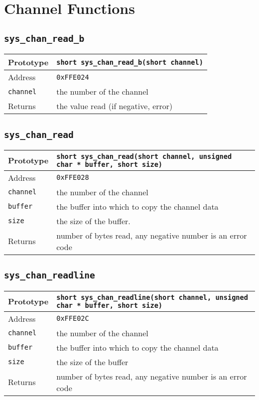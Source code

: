 \section{Channel Functions}

\subsection*{\texttt{sys\_chan\_read\_b}}
\begin{tabular}{|l||l|} \hline
Prototype & \lstinline!short sys_chan_read_b(short channel)! \\ \hline
Address & \texttt{0xFFE024} \\ \hline
\lstinline!channel! & the number of the channel \\ \hline
Returns & the value read (if negative, error) \\ \hline
\end{tabular}

\subsection*{\texttt{sys\_chan\_read}}
\begin{tabular}{|l||l|} \hline
Prototype & \lstinline!short sys_chan_read(short channel, unsigned char * buffer, short size)! \\ \hline
Address & \texttt{0xFFE028} \\ \hline
\lstinline!channel! & the number of the channel \\ \hline
\lstinline!buffer! & the buffer into which to copy the channel data \\ \hline
\lstinline!size! & the size of the buffer. \\ \hline
Returns & number of bytes read, any negative number is an error code \\ \hline
\end{tabular}

\subsection*{\texttt{sys\_chan\_readline}}
\begin{tabular}{|l||l|} \hline
Prototype & \lstinline!short sys_chan_readline(short channel, unsigned char * buffer, short size)! \\ \hline
Address & \texttt{0xFFE02C} \\ \hline
\lstinline!channel! & the number of the channel \\ \hline
\lstinline!buffer! & the buffer into which to copy the channel data \\ \hline
\lstinline!size! & the size of the buffer \\ \hline
Returns & number of bytes read, any negative number is an error code \\ \hline
\end{tabular}

